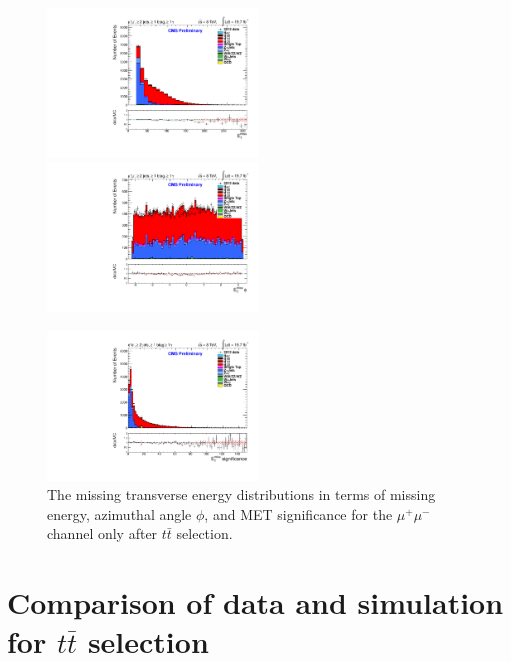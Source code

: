\begin{figure}
\includegraphics[width=0.5\textwidth]{Plots/ControlPlots/TTbarDiLeptonAnalysis/MuMu/MET/patType1CorrectedPFMet/MET_splitTTbar_ratio.pdf}
\includegraphics[width=0.5\textwidth]{Plots/ControlPlots/TTbarDiLeptonAnalysis/MuMu/MET/patType1CorrectedPFMet/MET_phi_splitTTbar_ratio.pdf}\\
\begin{center}
\includegraphics[width=0.5\textwidth]{Plots/ControlPlots/TTbarDiLeptonAnalysis/EE/MET/patType1CorrectedPFMet/METsignificance_splitTTbar_ratio.pdf}
\end{center}
\caption{The missing transverse energy distributions in terms of missing energy, azimuthal angle $\phi$, and MET significance for the $\mu^{+}\mu^{-}$ channel only after $t\bar{t}$ selection.}
\label{fig-METphiSig}
\end{figure}

\section{Comparison of data and simulation for $t\bar{t}$ selection}

